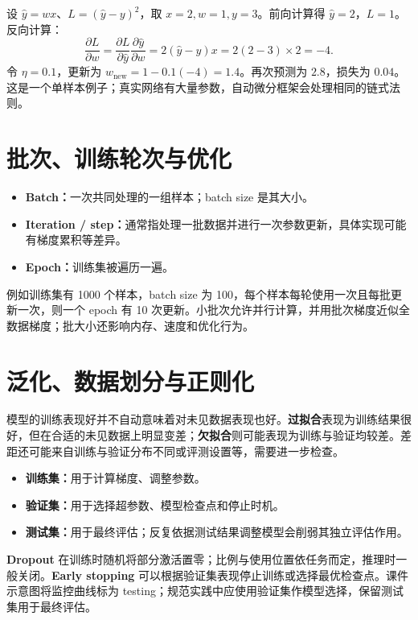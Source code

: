 \documentclass[11pt,a4paper,fontset=none]{ctexart}
\begin{document}
设 $\hat y=wx$、$L=(\hat y-y)^2$，取 $x=2,w=1,y=3$。前向计算得 $\hat y=2$，$L=1$。反向计算：
\[
\frac{\partial L}{\partial w}=
\frac{\partial L}{\partial\hat y}\frac{\partial\hat y}{\partial w}
=2(\hat y-y)x=2(2-3)\times2=-4.
\]
令 $\eta=0.1$，更新为 $w_{\mathrm{new}}=1-0.1(-4)=1.4$。再次预测为 $2.8$，损失为 $0.04$。这是一个单样本例子；真实网络有大量参数，自动微分框架会处理相同的链式法则。
\section{批次、训练轮次与优化}
\begin{itemize}
\item \textbf{Batch：}一次共同处理的一组样本；batch size 是其大小。
\item \textbf{Iteration / step：}通常指处理一批数据并进行一次参数更新，具体实现可能有梯度累积等差异。
\item \textbf{Epoch：}训练集被遍历一遍。
\end{itemize}
例如训练集有 1000 个样本，batch size 为 100，每个样本每轮使用一次且每批更新一次，则一个 epoch 有 10 次更新。小批次允许并行计算，并用批次梯度近似全数据梯度；批大小还影响内存、速度和优化行为。
\section{泛化、数据划分与正则化}
模型的训练表现好并不自动意味着对未见数据表现也好。\textbf{过拟合}表现为训练结果很好，但在合适的未见数据上明显变差；\textbf{欠拟合}则可能表现为训练与验证均较差。差距还可能来自训练与验证分布不同或评测设置等，需要进一步检查。
\begin{itemize}
\item \textbf{训练集：}用于计算梯度、调整参数。
\item \textbf{验证集：}用于选择超参数、模型检查点和停止时机。
\item \textbf{测试集：}用于最终评估；反复依据测试结果调整模型会削弱其独立评估作用。
\end{itemize}
\textbf{Dropout} 在训练时随机将部分激活置零；比例与使用位置依任务而定，推理时一般关闭。\textbf{Early stopping} 可以根据验证集表现停止训练或选择最优检查点。课件示意图将监控曲线标为 testing；规范实践中应使用验证集作模型选择，保留测试集用于最终评估。
\end{document}
